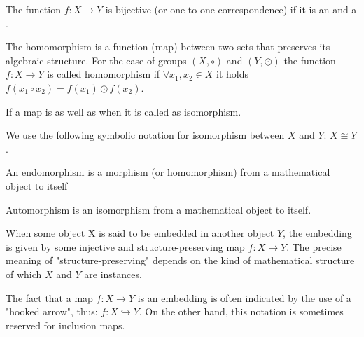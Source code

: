 \begin{appendices}
\begin{definition}[Bijection]
  The function $f: X \rightarrow Y$ is bijective (or one-to-one
  correspondence) if it is an  and a
  . 
  \label{def:bijection}
\end{definition}

\begin{definition}[Homomorphism]
  The homomorphism is a function (map) between two sets that preserves
  its algebraic structure. For the case of groups
  $\left(X, \circ\right)$ and $\left(Y, \odot\right)$ the function
  $f: X \rightarrow Y$ is called homomorphism if
  $\forall x_1, x_2 \in X$ it holds
  $f\left(x_1 \circ x_2\right) = f\left(x_1 \right) \odot f\left( x_2\right)$.
  \label{def:homomorphism}
\end{definition}

\begin{definition}[Isomorphism]
  If a map is  as well as
   when it is called as isomorphism.

  We use the following symbolic notation for isomorphism between $X$
  and $Y$: $X \cong Y$.
  \label{def:isomorphism}
\end{definition}

\begin{definition}[Endomorphism]
   An endomorphism is a morphism (or homomorphism) from a mathematical
   object to itself \cite{wiki:endomorphism}
   \label{def:endomorphism}
\end{definition}

\begin{definition}[Automorphism]
  Automorphism is an isomorphism from a mathematical object to itself.
  \label{def:automorphism}
\end{definition}

\begin{definition}[Embedding]
  When some object X is said to be embedded in another object $Y$, the
  embedding is given by some injective and structure-preserving map
  $f : X \to Y$. The precise meaning of "structure-preserving" depends on
  the kind of mathematical structure of which $X$ and $Y$ are
  instances.
  
  The fact that a map $f : X \to Y$ is an embedding is often indicated
  by the use of a "hooked arrow", thus: $f:X\hookrightarrow Y$. On the
  other hand, this notation is sometimes reserved for inclusion maps.
  \label{def:embedding}
\end{definition}


\end{appendices}

